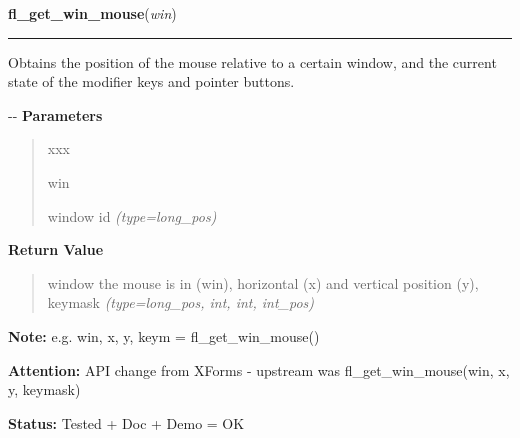 \hspace{.8\funcindent}\begin{boxedminipage}{\funcwidth}

    \raggedright \textbf{fl\_get\_win\_mouse}(\textit{win})

    \vspace{-1.5ex}

    \rule{\textwidth}{0.5\fboxrule}
\setlength{\parskip}{2ex}

Obtains the position of the mouse relative to a certain window, and
the current state of the modifier keys and pointer buttons.

-{}-
\setlength{\parskip}{1ex}
      \textbf{Parameters}
      \vspace{-1ex}

      \begin{quote}
        \begin{Ventry}{xxx}

          \item[win]


window id
            {\it (type=long\_pos)}

        \end{Ventry}

      \end{quote}

      \textbf{Return Value}
    \vspace{-1ex}

      \begin{quote}

window the mouse is in (win), horizontal (x) and vertical
position (y), keymask
      {\it (type=long\_pos, int, int, int\_pos)}

      \end{quote}

\textbf{Note:} 
e.g. win, x, y, keym = fl\_get\_win\_mouse()


\textbf{Attention:} 
API change from XForms - upstream was
fl\_get\_win\_mouse(win, x, y, keymask)


\textbf{Status:} 
Tested + Doc + Demo = OK


    \end{boxedminipage}

    \label{xformslib:flxbasic:fl_get_form_mouse}

    \vspace{0.5ex}

